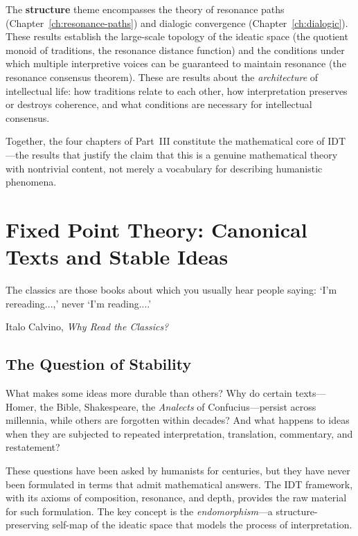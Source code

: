 \documentclass[11pt,openany]{book}
\theoremstyle{definition}
\theoremstyle{plain}
\theoremstyle{remark}
\begin{document}
The \textbf{structure} theme encompasses the theory of resonance paths (Chapter~\ref{ch:resonance-paths}) and dialogic convergence (Chapter~\ref{ch:dialogic}). These results establish the large-scale topology of the ideatic space (the quotient monoid of traditions, the resonance distance function) and the conditions under which multiple interpretive voices can be guaranteed to maintain resonance (the resonance consensus theorem). These are results about the \emph{architecture} of intellectual life: how traditions relate to each other, how interpretation preserves or destroys coherence, and what conditions are necessary for intellectual consensus.

Together, the four chapters of Part~III constitute the mathematical core of IDT---the results that justify the claim that this is a genuine mathematical theory with nontrivial content, not merely a vocabulary for describing humanistic phenomena.

\chapter{Fixed Point Theory: Canonical Texts and Stable Ideas}
\label{ch:fixed-point}

\epigraph{The classics are those books about which you usually hear people saying: `I'm rereading...,' never `I'm reading....'}{Italo Calvino, \textit{Why Read the Classics?}}

\section{The Question of Stability}

What makes some ideas more durable than others? Why do certain texts---Homer, the Bible, Shakespeare, the \emph{Analects} of Confucius---persist across millennia, while others are forgotten within decades? And what happens to ideas when they are subjected to repeated interpretation, translation, commentary, and restatement?

These questions have been asked by humanists for centuries, but they have never been formulated in terms that admit mathematical answers. The IDT framework, with its axioms of composition, resonance, and depth, provides the raw material for such formulation. The key concept is the \emph{endomorphism}---a structure-preserving self-map of the ideatic space that models the process of interpretation.
\end{document}
